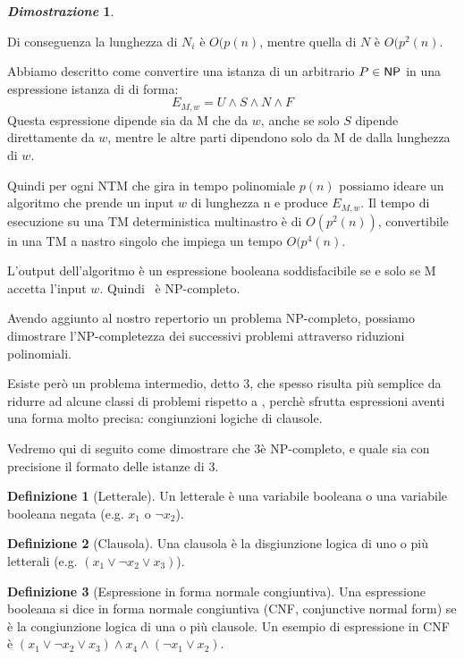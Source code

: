 \documentclass[12pt]{article}
\theoremstyle{definition}
\newtheorem*{mydef}{Definizione}
\newtheorem*{myproof}{\em Dimostrazione}
\begin{document}
\begin{myproof}
\begin{description}
    Di conseguenza la lunghezza di \(N_i\) \`e \(O(p(n)\), mentre quella di \(N\) \`e \(O(p^2(n)\).
    \newline
\end{description}

Abbiamo descritto come convertire una istanza di un arbitrario \(P \in {\ensuremath{\mathsf{NP}}}\) in una espressione
istanza di \SAT di forma:\[
E_{M,w} = U \land S \land N \land F 
\] Questa espressione dipende sia da M che da \(w\), anche se solo \(S\) dipende direttamente da \(w\),
mentre le altre parti dipendono solo da M de dalla lunghezza di \(w\).

Quindi per ogni NTM che gira in tempo polinomiale \(p(n)\) possiamo ideare un algoritmo che prende un input
\(w\) di lunghezza n e produce \(E_{M,w}\). Il tempo di esecuzione su una TM deterministica multinastro
\`e di \(O(p^2(n))\), convertibile in una TM a nastro singolo che impiega un tempo \(O(p^4(n)\).

L'output dell'algoritmo \`e un espressione booleana soddisfacibile se e solo se M accetta l'input \(w\).
Quindi \SAT\ \`e NP-completo.

\hfill \qedsymbol
\end{myproof}

Avendo aggiunto al nostro repertorio un problema NP-completo, possiamo dimostrare l'NP-completezza
dei successivi problemi attraverso riduzioni polinomiali.

Esiste per\`o un problema intermedio, detto 3\SAT, che spesso risulta pi\`u semplice da ridurre ad
alcune classi di problemi rispetto a \SAT, perch\`e sfrutta espressioni aventi una forma molto precisa:
congiunzioni logiche di clausole.

Vedremo qui di seguito come dimostrare che 3\SAT \`e NP-completo, e quale sia con precisione il formato
delle istanze di 3\SAT.

\begin{mydef}[Letterale]
  Un letterale \`e una variabile booleana o una variabile booleana negata (e.g. \(x_1\) o \(\lnot x_2\)).
\end{mydef}

\begin{mydef}[Clausola]
  Una clausola \`e la disgiunzione logica di uno o pi\`u letterali (e.g. \((x_1 \lor \lnot x_2 \lor x_3)\)).
\end{mydef}

\begin{mydef}[Espressione in forma normale congiuntiva]
  Una espressione booleana si dice in forma normale congiuntiva (CNF, conjunctive normal form) se
  \`e la congiunzione logica di una o pi\`u clausole. \newline Un esempio di espressione in CNF
  \`e \((x_1 \lor \lnot x_2 \lor x_3) \land x_4 \land (\lnot x_1 \lor x_2)\).
\end{mydef}
\end{document}
